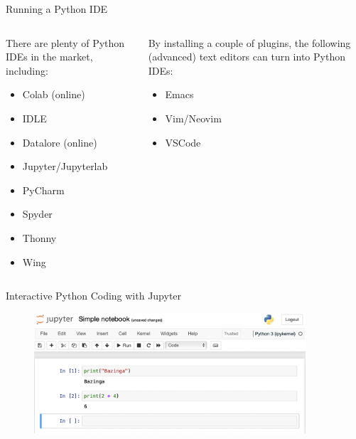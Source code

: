 \documentclass[aspectratio=1610]{beamer}
\begin{document}
\begin{frame}[t]{Running a Python IDE}

	\begin{columns}[t]
	
	\begin{column}{0.45\textwidth}

	There are plenty of Python IDEs in the market, including:
	
	\begin{itemize}
		\item Colab (online)
		\item IDLE
		\item Datalore (online)
		\item Jupyter/Jupyterlab
		\item PyCharm
		\item Spyder
		\item Thonny
		\item Wing
	\end{itemize}
	
	\end{column}
	
	\begin{column}{0.45\textwidth}
	
	By installing a couple of plugins, the following (advanced) text editors can turn into Python IDEs:
	
	\begin{itemize}
		\item Emacs
		\item Vim/Neovim
		\item VSCode
	\end{itemize}
	
	\end{column}
	
	\end{columns}
\end{frame}

\begin{frame}{Interactive Python Coding with Jupyter}
		\begin{figure}
			\includegraphics[width=0.9\textwidth]{images/jupyter}
		\end{figure}
\end{frame}
\end{document}
